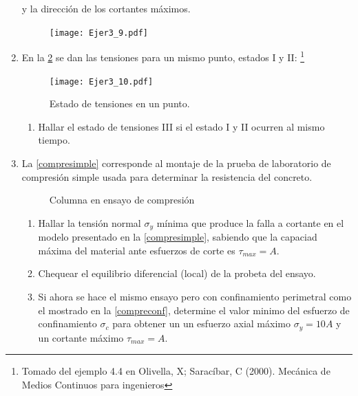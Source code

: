\documentclass[../notas medios.tex]{subfiles}
\begin{document}
\begin{enumerate}
y la direcci\'on de los cortantes m\'aximos.\\
%
\begin{figure}[H]
	\centering
	\texttt{[image: Ejer3\_9.pdf]}
	\caption{}
	\label{prisma}
\end{figure}
\item \label{punto10} En la \cref{super:cuna-square} se dan las tensiones
para un mismo punto, estados I y II:  \footnote{Tomado del ejemplo 4.4 en Olivella, X; Saracíbar, C (2000). Mecánica de Medios Continuos para ingenieros}\\
%
\begin{figure}[H]
	\centering
	\texttt{[image: Ejer3\_10.pdf]}
	\caption{Estado de tensiones en un punto.}
	\label{super:cuna-square}
\end{figure}
%
\begin{enumerate}
	\item Hallar el estado de tensiones III si el estado I y II ocurren al mismo tiempo.
\end{enumerate}
\item \label{punto11} La \cref{compresimple} corresponde al montaje
de la prueba de laboratorio de compresi\'on simple usada para determinar la resistencia del concreto.\\
%
\begin{figure}[H]	
	\centering	
	\hspace{10mm}
	\caption{Columna en ensayo de compresión}
\end{figure}
%
\begin{enumerate}
	\item Hallar la tensión normal $\sigma_y$ m\'inima que produce la falla a cortante en el modelo presentado en la \cref{compresimple}, sabiendo que la capaciad m\'axima del material ante esfuerzos de corte es $\tau_{max}=A$.
	\item Chequear el equilibrio diferencial (local) de la probeta del ensayo.
	\item Si ahora se hace el mismo ensayo pero con confinamiento perimetral como el mostrado en la \cref{compreconf}, determine el valor minimo del esfuerzo de confinamiento $\sigma_c$ para obtener un un  esfuerzo axial máximo $\sigma_y = 10A$ y un cortante máximo  $\tau_{max}=A$.
\end{enumerate}


\end{enumerate}
\end{document}
